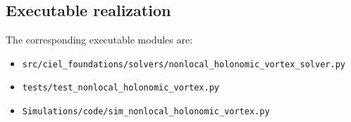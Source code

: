 \subsection{Executable realization}
The corresponding executable modules are:
\begin{itemize}
  \item \texttt{src/ciel\_foundations/solvers/nonlocal\_holonomic\_vortex\_solver.py}
  \item \texttt{tests/test\_nonlocal\_holonomic\_vortex.py}
  \item \texttt{Simulations/code/sim\_nonlocal\_holonomic\_vortex.py}
\end{itemize}
